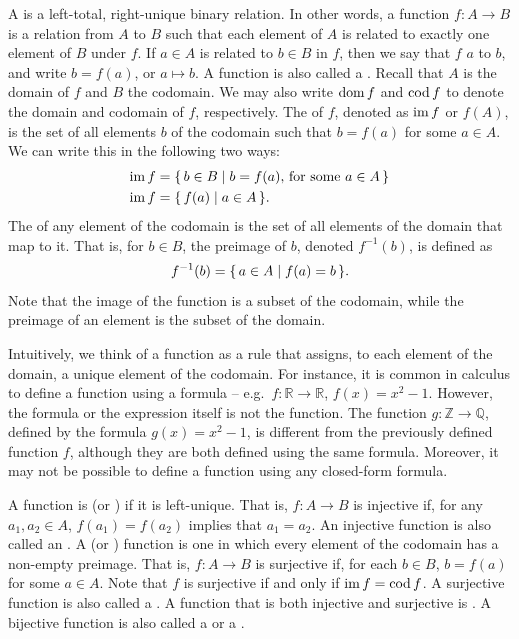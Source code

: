 A  is a left-total, right-unique binary relation. In other words, a function $f \colon A \to B$ is a relation from $A$ to $B$ such that each element of $A$ is related to exactly one element of $B$ under $f$. If $a \in A$ is related to $b \in B$ in $f$, then we say that $f$  $a$ to $b$, and write $b = f(a)$, or $a \mapsto b$. A function is also called a . Recall that $A$ is the domain of $f$ and $B$ the codomain. We may also write $\operatorname{dom} f$ and $\operatorname{cod} f$ to denote the domain and codomain of $f$, respectively. The  of $f$, denoted as $\operatorname{im} f$ or $f(A)$, is the set of all elements $b$ of the codomain such that $b = f(a)$ for some $a \in A$. We can write this in the following two ways:
\begin{align*}
\operatorname{im} f & = \qty{\, b \in B \mid b = f(a),\, \text{for some}~ a \in A \,} \\
\operatorname{im} f & = \qty{\, f(a) \mid a \in A \,}.
\end{align*}
The  of any element of the codomain is the set of all elements of the domain that map to it. That is, for $b \in B$, the preimage of $b$, denoted $f^{-1}(b)$, is defined as
\begin{equation*}
f^{-1}(b) = \qty{\, a \in A \mid f(a) = b \,}.
\end{equation*}
Note that the image of the function is a subset of the codomain, while the preimage of an element is the subset of the domain.

\begin{Note*}
Intuitively, we think of a function as a rule that assigns, to each element of the domain, a unique element of the codomain. For instance, it is common in calculus to define a function using a formula -- e.g.\ $f \colon \mathbb R \to \mathbb R$, $f(x) = x^2 - 1$. However, the formula or the expression itself is not the function. The function $g \colon \mathbb Z \to \mathbb Q$, defined by the formula $g(x) = x^2 - 1$, is different from the previously defined function $f$, although they are both defined using the same formula. Moreover, it may not be possible to define a function using any closed-form formula.
\end{Note*}

A function is  (or ) if it is left-unique. That is, $f \colon A \to B$ is injective if, for any $a_1, a_2 \in A$, $f(a_1) = f(a_2)$ implies that $a_1 = a_2$. An injective function is also called an . A  (or ) function is one in which every element of the codomain has a non-empty preimage. That is, $f \colon A \to B$ is surjective if, for each $b \in B$, $b = f(a)$ for some $a \in A$. Note that $f$ is surjective if and only if $\operatorname{im} f = \operatorname{cod} f$. A surjective function is also called a . A function that is both injective and surjective is . A bijective function is also called a  or a .

